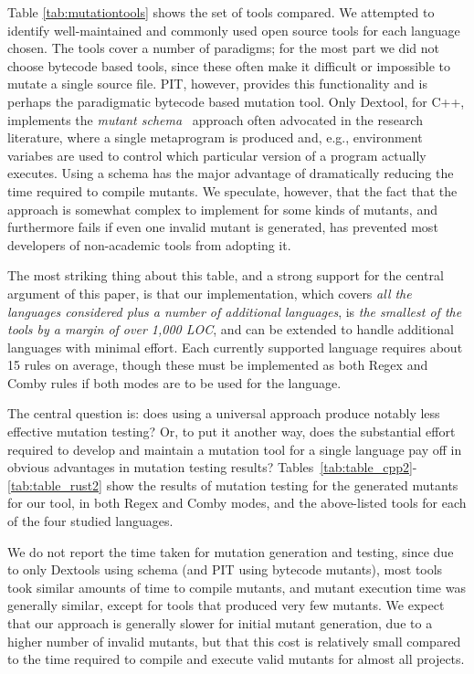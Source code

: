 \documentclass[sigconf,review, anonymous]{acmart}
\begin{document}
{Table \ref{tab:mutationtools} shows the set of tools compared.  We
attempted to identify well-maintained and commonly used open
source tools for each
language chosen.  The tools cover a number of paradigms; for the most
part we did not choose bytecode based tools, since these often make it
difficult or impossible to mutate a single source file.  PIT, however,
provides this functionality and is perhaps the paradigmatic bytecode
based mutation tool.  Only Dextool, for C++, implements the
\emph{mutant schema}~\cite{untch1993mutation} approach often advocated
in the research literature, where a single metaprogram is produced
and, e.g., environment variabes are used to control which particular
version of a program actually executes.  Using a schema has the major
advantage of dramatically reducing the time required to compile
mutants.  We speculate, however, that the fact that the approach is
somewhat complex to implement for some kinds of mutants, and
furthermore fails if even one invalid mutant is generated, has
prevented most developers of non-academic tools from adopting it.

The most striking thing about this table, and a strong support for
the central argument of this paper, is that our implementation, which
covers \emph{all the languages considered plus a number of additional
languages}, is \emph{the smallest of the tools by a margin of over 1,000 LOC},
and can be extended to handle additional languages with minimal
effort.  Each currently supported language requires about 15 rules on
average, though these must be implemented as both Regex and Comby
rules if both modes are to be used for the language.

The central question is: does using a universal approach produce
notably less effective mutation testing?  Or, to put it another way,
does the substantial effort required to develop and maintain a
mutation tool for a single language pay off in obvious advantages in
mutation testing results?
Tables~\ref{tab:table_cpp2}-\ref{tab:table_rust2} show the results of
mutation testing for the generated mutants for our tool, in both Regex
and Comby modes, and the above-listed tools for each of the four
studied languages.

We do not report the time taken for mutation generation and testing,
since due to only Dextools using schema (and PIT using bytecode mutants), most tools took similar
amounts of time to compile mutants, and mutant execution time was
generally similar, except for tools that produced very few mutants.
We expect that our approach is generally slower for initial mutant
generation, due to a higher number of invalid mutants, but that this
cost is relatively small compared to the time required to compile and
execute valid mutants for almost all projects.

}
\end{document}
